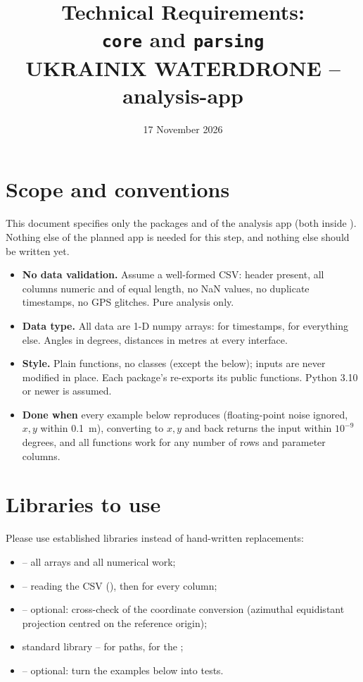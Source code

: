 \documentclass{article}
\title{Technical Requirements:\\ \texttt{core} and \texttt{parsing}\\[1mm]
       \large UKRAINIX WATERDRONE -- analysis-app}
\author{}
\date{17 November 2026}
\begin{document}
\maketitle

\section{Scope and conventions}

This document specifies only the packages  and 
of the analysis app (both inside ). Nothing else of
the planned app is needed for this step, and nothing else should be written
yet.

\begin{itemize}
\item \textbf{No data validation.} Assume a well-formed CSV: header present,
      all columns numeric and of equal length, no NaN values, no duplicate
      timestamps, no GPS glitches. Pure analysis only.
\item \textbf{Data type.} All data are 1-D numpy arrays:  for
      timestamps,  for everything else. Angles in degrees,
      distances in metres at every interface.
\item \textbf{Style.} Plain functions, no classes (except the
       below); inputs are never modified in place. Each
      package's  re-exports its public functions. Python
      3.10 or newer is assumed.
\item \textbf{Done when} every example below reproduces (floating-point noise
      ignored, $x,y$ within 0.1~m), converting to $x,y$ and back returns the
      input within $10^{-9}$ degrees, and all functions work for any number of
      rows and parameter columns.
\end{itemize}

\section{Libraries to use}

Please use established libraries instead of hand-written replacements:

\begin{itemize}
\item {} -- all arrays and all numerical work;
\item {} -- reading the CSV (), then
       for every column;
\item {} -- optional: cross-check of the coordinate conversion
      (azimuthal equidistant projection centred on the reference origin);
\item standard library --  for paths,  for the
      ;
\item {} -- optional: turn the examples below into tests.
\end{itemize}
\end{document}
